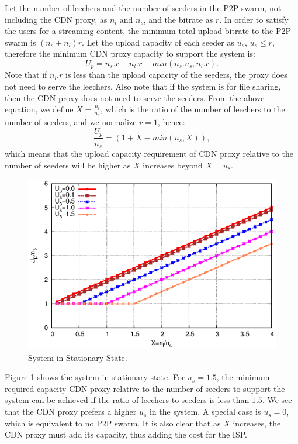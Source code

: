 \documentclass[paper]{ieice}
\begin{document}
Let the number of leechers and the number of seeders in the P2P swarm, not including the CDN proxy, as $n_l$ and $n_s$, and the bitrate as $r$.
In order to satisfy the users for a streaming content, the minimum total upload bitrate to the P2P swarm is $(n_s + n_l)r$.
Let the upload capacity of each seeder as $u_s$, $u_s \leq r$, therefore the minimum CDN proxy capacity to support the system is:
\begin{equation}
        U_p = n_s.r + n_l.r - min(n_s.u_s, n_l.r).
\end{equation}
Note that if $n_l.r$ is less than the upload capacity of the seeders, the proxy does not need to serve the leechers.
Also note that if the system is for file sharing, then the CDN proxy does not need to serve the seeders.
From the above equation, we define $X=\frac{n_l}{n_s}$, which is the ratio of the number of leechers to the number of seeders, and we normalize $r=1$, hence:
\begin{equation}
        \frac{U_p}{n_s} = (1 + X - min (u_s,X)),
\end{equation}
which means that the upload capacity requirement of CDN proxy relative to the number of seeders will be higher as $X$ increases beyond $X = u_s$.

\begin{figure}[hb] 
\begin{center}
\includegraphics[scale=0.5]{graphs/stable-steady-state.eps}
\end{center}
\caption{System in Stationary State.}
\label{fig:steadystate}
\vspace{-2mm}
\end{figure}

Figure \ref{fig:steadystate} shows the system in stationary state.
For $u_s=1.5$, the minimum required capacity CDN proxy relative to the number of seeders to support the system can be achieved if the ratio of leechers to seeders is less than $1.5$.
We see that the CDN proxy prefers a higher $u_s$ in the system.
A special case is $u_s = 0$, which is equivalent to no P2P swarm.
It is also clear that as $X$ increases, the CDN proxy must add its capacity, thus adding the cost for the ISP.
\end{document}
